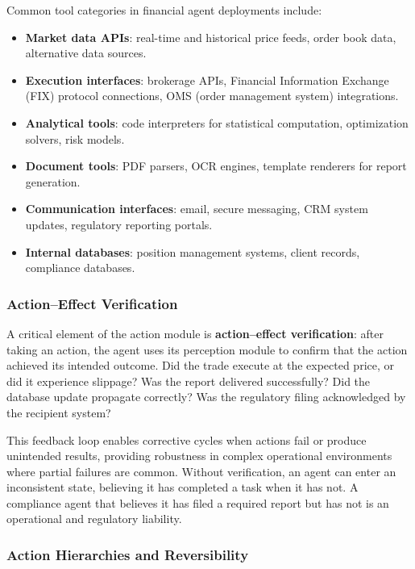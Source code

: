 \documentclass{article}
\begin{document}
Common tool categories in financial agent deployments include:

\begin{itemize}
  \item \textbf{Market data APIs}: real-time and historical price feeds, order book data, alternative data sources.
  \item \textbf{Execution interfaces}: brokerage APIs, Financial Information Exchange (FIX) protocol connections, OMS (order management system) integrations.
  \item \textbf{Analytical tools}: code interpreters for statistical computation, optimization solvers, risk models.
  \item \textbf{Document tools}: PDF parsers, OCR engines, template renderers for report generation.
  \item \textbf{Communication interfaces}: email, secure messaging, CRM system updates, regulatory reporting portals.
  \item \textbf{Internal databases}: position management systems, client records, compliance databases.
\end{itemize}

\subsubsection{Action--Effect Verification}

A critical element of the action module is \textbf{action--effect verification}: after taking an action, the agent uses its perception module to confirm that the action achieved its intended outcome. Did the trade execute at the expected price, or did it experience slippage? Was the report delivered successfully? Did the database update propagate correctly? Was the regulatory filing acknowledged by the recipient system?

This feedback loop enables corrective cycles when actions fail or produce unintended results, providing robustness in complex operational environments where partial failures are common. Without verification, an agent can enter an inconsistent state, believing it has completed a task when it has not. A compliance agent that believes it has filed a required report but has not is an operational and regulatory liability.

\subsubsection{Action Hierarchies and Reversibility}
\end{document}
